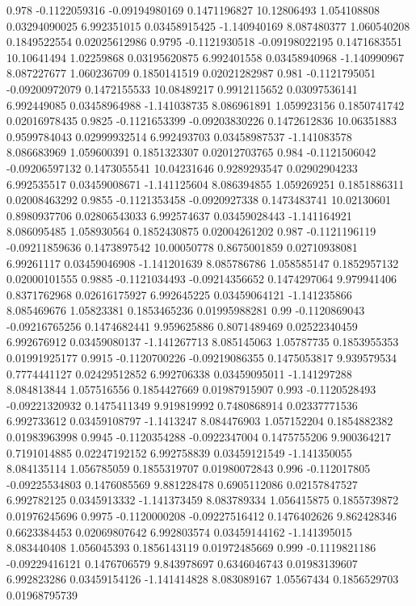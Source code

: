 {0.978 -0.1122059316 -0.09194980169 0.1471196827 10.12806493 1.054108808 0.03294090025 6.992351015 0.03458915425 -1.140940169 8.087480377 1.060540208 0.1849522554 0.02025612986
0.9795 -0.1121930518 -0.09198022195 0.1471683551 10.10641494 1.02259868 0.03195620875 6.992401558 0.03458940968 -1.140990967 8.087227677 1.060236709 0.1850141519 0.02021282987
0.981 -0.1121795051 -0.09200972079 0.1472155533 10.08489217 0.9912115652 0.03097536141 6.992449085 0.03458964988 -1.141038735 8.086961891 1.059923156 0.1850741742 0.02016978435
0.9825 -0.1121653399 -0.09203830226 0.1472612836 10.06351883 0.9599784043 0.02999932514 6.992493703 0.03458987537 -1.141083578 8.086683969 1.059600391 0.1851323307 0.02012703765
0.984 -0.1121506042 -0.09206597132 0.1473055541 10.04231646 0.9289293547 0.02902904233 6.992535517 0.03459008671 -1.141125604 8.086394855 1.059269251 0.1851886311 0.02008463292
0.9855 -0.1121353458 -0.0920927338 0.1473483741 10.02130601 0.8980937706 0.02806543033 6.992574637 0.03459028443 -1.141164921 8.086095485 1.058930564 0.1852430875 0.02004261202
0.987 -0.1121196119 -0.09211859636 0.1473897542 10.00050778 0.8675001859 0.02710938081 6.99261117 0.03459046908 -1.141201639 8.085786786 1.058585147 0.1852957132 0.02000101555
0.9885 -0.1121034493 -0.09214356652 0.1474297064 9.979941406 0.8371762968 0.02616175927 6.992645225 0.03459064121 -1.141235866 8.085469676 1.05823381 0.1853465236 0.01995988281
0.99 -0.1120869043 -0.09216765256 0.1474682441 9.959625886 0.8071489469 0.02522340459 6.992676912 0.03459080137 -1.141267713 8.085145063 1.05787735 0.1853955353 0.01991925177
0.9915 -0.1120700226 -0.09219086355 0.1475053817 9.939579534 0.7774441127 0.02429512852 6.992706338 0.03459095011 -1.141297288 8.084813844 1.057516556 0.1854427669 0.01987915907
0.993 -0.1120528493 -0.09221320932 0.1475411349 9.919819992 0.7480868914 0.02337771536 6.992733612 0.03459108797 -1.1413247 8.084476903 1.057152204 0.1854882382 0.01983963998
0.9945 -0.1120354288 -0.0922347004 0.1475755206 9.900364217 0.7191014885 0.02247192152 6.992758839 0.03459121549 -1.141350055 8.084135114 1.056785059 0.1855319707 0.01980072843
0.996 -0.112017805 -0.09225534803 0.1476085569 9.881228478 0.6905112086 0.02157847527 6.992782125 0.0345913332 -1.141373459 8.083789334 1.056415875 0.1855739872 0.01976245696
0.9975 -0.1120000208 -0.09227516412 0.1476402626 9.862428346 0.6623384453 0.02069807642 6.992803574 0.03459144162 -1.141395015 8.083440408 1.056045393 0.1856143119 0.01972485669
0.999 -0.1119821186 -0.09229416121 0.1476706579 9.843978697 0.6346046743 0.01983139607 6.992823286 0.03459154126 -1.141414828 8.083089167 1.05567434 0.1856529703 0.01968795739
}
